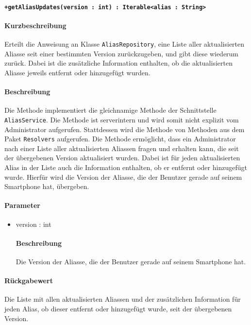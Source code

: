 \paragraph*{\texttt{+getAliasUpdates(version : int) : Iterable<alias : String>}}%
\paragraph*{Kurzbeschreibung}
Erteilt die Anweisung an Klasse \texttt{AliasRepository}, eine Liste aller aktualisierten Aliasse seit einer bestimmten Version zurückzugeben, und gibt diese wiederum zurück. Dabei ist die zusätzliche Information enthalten, ob die aktualisierten Aliasse jeweils entfernt oder hinzugefügt wurden.
\paragraph*{Beschreibung}
Die Methode implementiert die gleichnamige Methode der Schnittstelle \texttt{AliasService}.
Die Methode ist serverintern und wird somit nicht explizit vom Administrator aufgerufen.
Stattdessen wird die Methode von Methoden aus dem Paket \texttt{Resolvers} aufgerufen.
Die Methode ermöglicht, dass ein Administrator nach einer Liste aller aktualisierten Aliassen fragen und erhalten kann, die seit der übergebenen Version aktualisiert wurden.
Dabei ist für jeden aktualisierten Alias in der Liste auch die Information enthalten, ob er entfernt oder hinzugefügt wurde.
Hierfür wird die Version der Aliasse, die der Benutzer gerade auf seinem Smartphone hat, übergeben.
\paragraph*{Parameter}
\begin{itemize}
    \item version : int
    		\paragraph*{Beschreibung}
    		Die Version der Aliasse, die der Benutzer gerade auf seinem Smartphone hat.
\end{itemize}
\paragraph*{Rückgabewert}
Die Liste mit allen aktualisierten Aliassen und der zusätzlichen Information für jeden Alias, ob dieser entfernt oder hinzugefügt wurde, seit der übergebenen Version.
